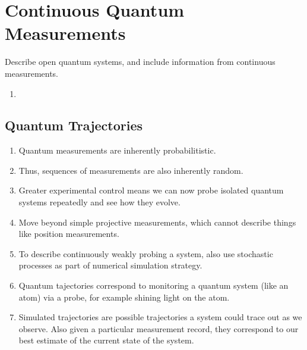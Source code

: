 \section{Continuous Quantum Measurements}

Describe open quantum systems, and include information from continuous measurements. 
\begin{enumerate}
  \item 
\end{enumerate}


\subsection{Quantum Trajectories}

\begin{enumerate}
\item Quantum measurements are inherently probabilitistic.  
\item Thus, sequences of measurements are also inherently random.  
\item Greater experimental control means we can now probe isolated quantum systems repeatedly and see how they evolve.  
\item Move beyond simple projective measurements, which cannot describe things like position measurements.
\item To describe continuously weakly probing a system, also use stochastic processes as part of
 numerical simulation strategy.
\item Quantum tajectories correspond to monitoring a quantum system (like an atom) via a probe,
 for example shining light on the atom. \cite{Carmichael1993}
\item Simulated trajectories are possible trajectories a system could trace out as we observe.
  Also given a particular measurement record, they correspond to our best estimate of the current state of the system.  
\end{enumerate}



